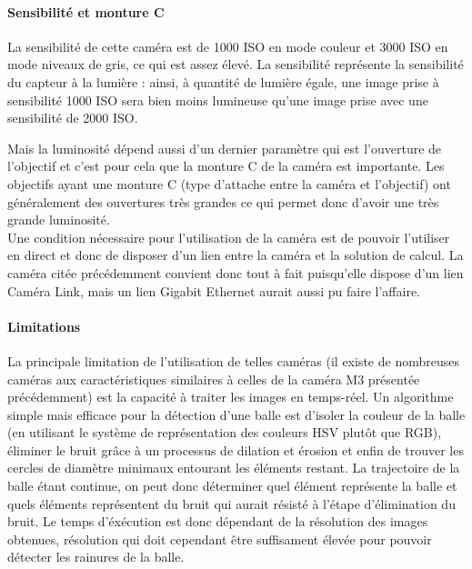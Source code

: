 \paragraph{Sensibilité et monture C\\}

La sensibilité de cette caméra est de 1000 ISO en mode couleur et 3000 ISO en mode niveaux de gris, ce qui est assez élevé. La sensibilité représente la sensibilité du capteur à la lumière : ainsi, à quantité de lumière égale, une image prise à sensibilité 1000 ISO sera bien moins lumineuse qu'une image prise avec une sensibilité de 2000 ISO. 

Mais la luminosité dépend aussi d'un dernier paramètre qui est l'ouverture de l'objectif et c'est pour cela que la monture C de la caméra est importante. Les objectifs ayant une monture C (type d'attache entre la caméra et l'objectif) ont généralement des ouvertures très grandes ce qui permet donc d'avoir une très grande luminosité. \\


Une condition nécessaire pour l'utilisation de la caméra est de pouvoir l'utiliser en direct et donc de disposer d'un lien entre la caméra et la solution de calcul. La caméra citée précédemment convient donc tout à fait puisqu'elle dispose d'un lien Caméra Link, mais un lien Gigabit Ethernet aurait aussi pu faire l'affaire.

\paragraph{Limitations\\}

La principale limitation de l'utilisation de telles caméras (il existe de nombreuses caméras aux caractéristiques similaires à celles de la caméra M3 présentée précédemment) est la capacité à traiter les images en temps-réel. Un algorithme simple mais efficace pour la détection d'une balle est d'isoler la couleur de la balle (en utilisant le système de représentation des couleurs HSV plutôt que RGB), éliminer le bruit grâce à un processus de dilation et érosion et enfin de trouver les cercles de diamètre minimaux entourant les éléments restant. La trajectoire de la balle étant continue, on peut donc déterminer quel élément représente la balle et quels éléments représentent du bruit qui aurait résisté à l'étape d'élimination du bruit. Le temps d'éxécution est donc dépendant de la résolution des images obtenues, résolution qui doit cependant être suffisament élevée pour pouvoir détecter les rainures de la balle. 


